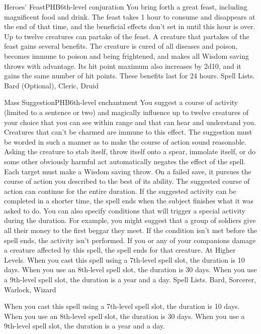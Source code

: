 \begin{spell}{Heroes' Feast}{PHB}{6th-level conjuration}
{
}
You bring forth a great feast, including magnificent food and drink. The feast takes 1 hour to consume and disappears at the end of that time, and the beneficial effects don’t set in until this hour is over. Up to twelve creatures can partake of the feast.
A creature that partakes of the feast gains several benefits. The creature is cured of all diseases and poison, becomes immune to poison and being frightened, and makes all Wisdom saving throws with advantage. Its hit point maximum also increases by 2d10, and it gains the same number of hit points. These benefits last for 24 hours.
Spell Lists. Bard (Optional), Cleric, Druid
\end{spell}

\begin{spell}{Mass Suggestion}{PHB}{6th-level enchantment}
{
}
You suggest a course of activity (limited to a sentence or two) and magically influence up to twelve creatures of your choice that you can see within range and that can hear and understand you. Creatures that can’t be charmed are immune to this effect. The suggestion must be worded in such a manner as to make the course of action sound reasonable. Asking the creature to stab itself, throw itself onto a spear, immolate itself, or do some other obviously harmful act automatically negates the effect of the spell.
Each target must make a Wisdom saving throw. On a failed save, it pursues the course of action you described to the best of its ability. The suggested course of action can continue for the entire duration. If the suggested activity can be completed in a shorter time, the spell ends when the subject finishes what it was asked to do.
You can also specify conditions that will trigger a special activity during the duration. For example, you might suggest that a group of soldiers give all their money to the first beggar they meet. If the condition isn’t met before the spell ends, the activity isn’t performed.
If you or any of your companions damage a creature affected by this spell, the spell ends for that creature.
At Higher Levels. When you cast this spell using a 7th-level spell slot, the duration is 10 days. When you use an 8th-level spell slot, the duration is 30 days. When you use a 9th-level spell slot, the duration is a year and a day.
Spell Lists. Bard, Sorcerer, Warlock, Wizard

 When you cast this spell using a 7th-level spell slot, the duration is 10 days. When you use an 8th-level spell slot, the duration is 30 days. When you use a 9th-level spell slot, the duration is a year and a day.
\end{spell}

